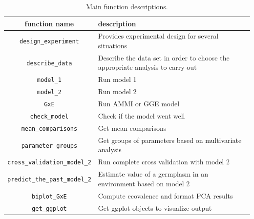 \documentclass{book}\usepackage[]{graphicx}\usepackage[]{color}
\begin{document}
\begin{table}[H]
\begin{tabular}{cp{}}

\hline
\textbf{function name} & \textbf{description} \\ \hline

\texttt{design\_experiment} & Provides experimental design for several situations \\ \hline

\texttt{describe\_data} & Describe the data set in order to choose the appropriate analysis to carry out \\ \hline

\texttt{model\_1} & Run model 1 \\ \hline

\texttt{model\_2} & Run model 2 \\ \hline

\texttt{GxE} & Run AMMI or GGE model \\ \hline

\texttt{check\_model} &  Check if the model went well \\ \hline

\texttt{mean\_comparisons} &  Get mean comparisons \\ \hline

\texttt{parameter\_groups} & Get groups of parameters based on multivariate analysis \\ \hline

\texttt{cross\_validation\_model\_2} & Run complete cross validation with model 2 \\ \hline

\texttt{predict\_the\_past\_model\_2} & Estimate value of a germplasm in an environment based on model 2 \\ \hline

\texttt{biplot\_GxE} & Compute ecovalence and format PCA results \\ \hline

\texttt{get\_ggplot} & Get ggplot objects to visualize output \\ \hline

\end{tabular}
\caption{Main function descriptions.}
\label{function_descriptions_workflow}
\end{table}
\end{document}
